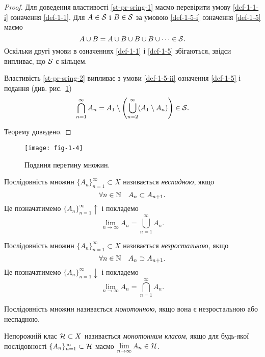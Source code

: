 \begin{proof}
	Для доведення властивості \ref{st-pr-sring-1} маємо перевірити умову \ref{def-1-1-i} означення \ref{def-1-1}. Для $A\in\mathcal S$ і $B\in\mathcal S$ за умовою \ref{def-1-5-i} означення \ref{def-1-5} маємо
	$$
	A\cup B= A\cup B\cup B\cup B\cup \cdots \in\mathcal S.
	$$
	Оскільки другі умови в означеннях \ref{def-1-1} і \ref{def-1-5} збігаються, звідси випливає, що $\mathcal S$ є кільцем.
	
	Властивість \ref{st-pr-sring-2} випливає з умови \ref{def-1-5-ii} означення \ref{def-1-5} і подання (див. рис.~\ref{fig-1-4})
	$$
	\bigcap_{n=1}^\infty A_n= A_1\setminus \left( \bigcup_{n=2}^\infty (A_1\setminus A_n)\right)\in\mathcal S. 	
	$$
	
	Теорему доведено.
\end{proof}

\begin{figure}[!h]
	\centering
	\texttt{[image: fig-1-4]}
	\caption{Подання перетину множин.}
	\label{fig-1-4}
\end{figure}

\begin{definition}
	\label{def-incr}
	Послідовність множин $\{A_n\}_{n=1}^\infty\subset X$
	називається \emph{неспадною}, якщо
	$$
	\forall n\in{\mathbb N}\quad A_n\subset A_{n+1}.
	$$
	Це позначатимемо $\{A_n\}_{n=1}^\infty\uparrow$ і покладемо
	\begin{equation}
	\label{1.2}
	\lim_{n\to\infty} A_n= \bigcup_{n=1}^\infty A_n.
	\end{equation}
\end{definition}

\begin{definition}
	\label{def-decr}
	Послідовність множин $\{A_n\}_{n=1}^\infty\subset X$
	називається \emph{незростальною}, якщо
	$$
	\forall n\in{\mathbb N}\quad A_n\supset A_{n+1}.
	$$
	Це позначатимемо $\{A_n\}_{n=1}^\infty\downarrow$ і покладемо
	\begin{equation}
	\label{1.3}
	\lim_{n\to\infty} A_n= \bigcap_{n=1}^\infty A_n.
	\end{equation}
\end{definition}

\begin{definition}
	\label{def-mon}
	Послідовність множин називається \emph{монотонною}, якщо вона є незростальною або неспадною.
\end{definition}

\begin{definition}
	\label{def-1-6}
	Непорожній клас $\mathcal H\subset X$ називається \emph{монотонним класом}, якщо для будь-якої послідовності $\{A_n\}_{n=1}^\infty\subset \mathcal H$ маємо $\displaystyle\lim_{n\to\infty} A_n\in\mathcal H$.
\end{definition}

